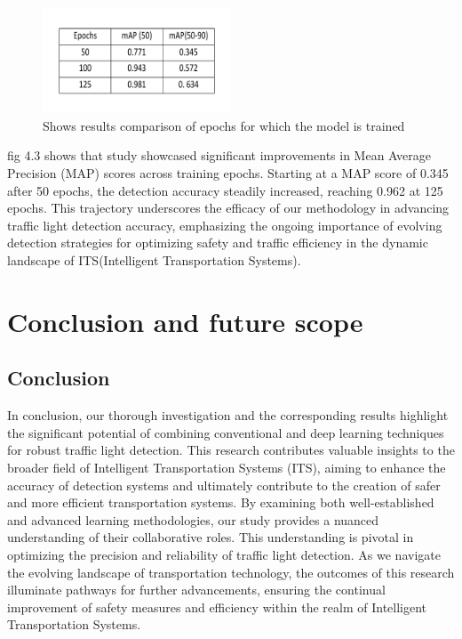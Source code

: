 \documentclass[12 pt]{report}
\begin{document}
{{    \begin{figure}[h]
      \centering
      \includegraphics[width=0.5\textwidth]{Comaprison Results.png}
      \caption{Shows results comparison of epochs for which the model is trained}
      \label{fig: YoloV8 implementation}
    \end{figure}

    \begin{justify}
    \hspace*{1cm} fig 4.3 shows that study showcased significant improvements in Mean Average Precision (MAP) scores across training epochs. Starting at a MAP score of 0.345 after 50 epochs, the detection accuracy steadily increased, reaching 0.962 at 125 epochs. This trajectory underscores the efficacy of our methodology in advancing traffic light detection accuracy, emphasizing the ongoing importance of evolving detection strategies for optimizing safety and traffic efficiency in the dynamic landscape of ITS(Intelligent Transportation Systems).
    \end{justify}
  }
 }



\newpage
\chapter{Conclusion and future scope}
\section{Conclusion}
\justify
 {
  \hspace*{1cm} In conclusion, our thorough investigation and the corresponding results highlight the significant potential of combining conventional and deep learning techniques for robust traffic light detection. This research contributes valuable insights to the broader field of Intelligent Transportation Systems (ITS), aiming to enhance the accuracy of detection systems and ultimately contribute to the creation of safer and more efficient transportation systems. By examining both well-established and advanced learning methodologies, our study provides a nuanced understanding of their collaborative roles. This understanding is pivotal in optimizing the precision and reliability of traffic light detection. As we navigate the evolving landscape of transportation technology, the outcomes of this research illuminate pathways for further advancements, ensuring the continual improvement of safety measures and efficiency within the realm of Intelligent Transportation Systems.
 }
\end{document}
